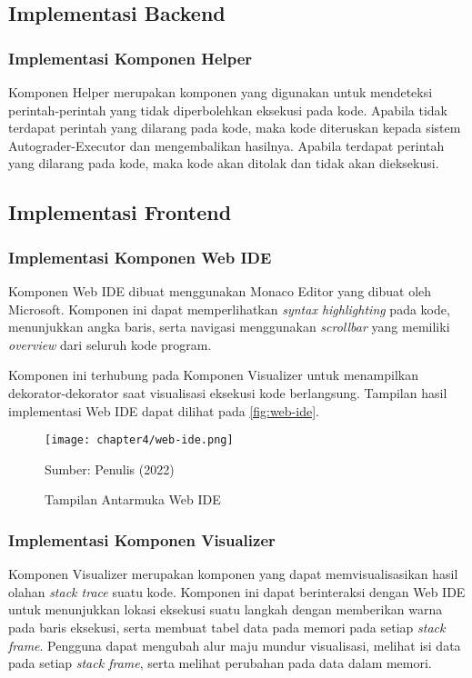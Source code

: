 \subsection{Implementasi Backend}
\subsubsection{Implementasi Komponen Helper}
Komponen Helper merupakan komponen yang digunakan untuk mendeteksi perintah-perintah yang tidak diperbolehkan eksekusi pada kode. Apabila tidak terdapat perintah yang dilarang pada kode, maka kode diteruskan kepada sistem Autograder-Executor dan mengembalikan hasilnya. Apabila terdapat perintah yang dilarang pada kode, maka kode akan ditolak dan tidak akan dieksekusi.


\subsection{Implementasi Frontend}

\subsubsection{Implementasi Komponen Web IDE}
Komponen Web IDE dibuat menggunakan Monaco Editor yang dibuat oleh Microsoft. Komponen ini dapat memperlihatkan \textit{syntax highlighting} pada kode, menunjukkan angka baris, serta navigasi menggunakan \textit{scrollbar} yang memiliki \textit{overview} dari seluruh kode program.

Komponen ini terhubung pada Komponen Visualizer untuk menampilkan dekorator-dekorator saat visualisasi eksekusi kode berlangsung. Tampilan hasil implementasi Web IDE dapat dilihat pada \autoref{fig:web-ide}.

\begin{figure}[!h]
  \centering
  \texttt{[image: chapter4/web-ide.png]}
  \caption{Tampilan Antarmuka Web IDE} \label{fig:web-ide}
  Sumber: Penulis (2022)
\end{figure}

\subsubsection{Implementasi Komponen Visualizer}
Komponen Visualizer merupakan komponen yang dapat memvisualisasikan hasil olahan \textit{stack trace} suatu kode. Komponen ini dapat berinteraksi dengan Web IDE untuk menunjukkan lokasi eksekusi suatu langkah dengan memberikan warna pada baris eksekusi, serta membuat tabel data pada memori pada setiap \textit{stack frame}. Pengguna dapat mengubah alur maju mundur visualisasi, melihat isi data pada setiap \textit{stack frame}, serta melihat perubahan pada data dalam memori.

